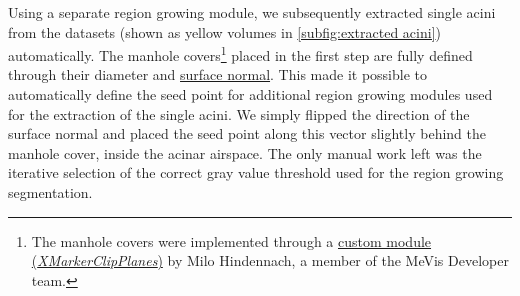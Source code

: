 \documentclass[%
	draft=true,
	paper=a4,%
	twoside=true,%
	abstract=true]{scrartcl}
\begin{document}
Using a separate region growing module, we subsequently extracted single acini from the datasets (shown as yellow volumes in \autoref{subfig:extracted acini}) automatically. The manhole covers\footnote{The manhole covers were implemented through a \href{http://www.mevis-research.de/cgi-bin/discus/board-auth.cgi?lm=1282233250&file=/839/11760.html}{custom module (\emph{XMarkerClipPlanes})} by Milo Hindennach, a member of the MeVis Developer team.} placed in the first step are fully defined through their diameter and \href{https://secure.wikimedia.org/wikipedia/en/w/index.php?title=Surface_normal&oldid=411684319}{surface normal}. This made it possible to automatically define the seed point for additional region growing modules used for the extraction of the single acini. We simply flipped the direction of the surface normal and placed the seed point along this vector slightly behind the manhole cover, inside the acinar airspace. The only manual work left was the iterative selection of the correct gray value threshold used for the region growing segmentation.
\end{document}

